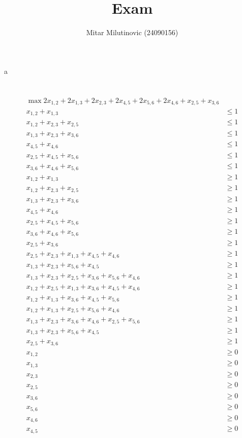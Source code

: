 \documentclass[a4paper,11pt,oneside,onecolumn]{article}
\title{Exam}
\author{Mitar Milutinovic (24090156)}
\begin{document}
\maketitle

\section{}

a

\section{}

\begin{align*}
\max 2x_{1,2} + 2x_{1,3} + 2x_{2,3} + 2x_{4,5} + 2x_{5,6} + 2x_{4,6} + x_{2,5} + x_{3,6} & \\
x_{1,2} + x_{1,3} & \le 1 \\
x_{1,2} + x_{2,3} + x_{2,5} & \le 1 \\
x_{1,3} + x_{2,3} + x_{3,6} & \le 1 \\
x_{4,5} + x_{4,6} & \le 1 \\
x_{2,5} + x_{4,5} + x_{5,6} & \le 1 \\
x_{3,6} + x_{4,6} + x_{5,6} & \le 1 \\
x_{1,2} + x_{1,3} & \ge 1 \\
x_{1,2} + x_{2,3} + x_{2,5} & \ge 1 \\
x_{1,3} + x_{2,3} + x_{3,6} & \ge 1 \\
x_{4,5} + x_{4,6} & \ge 1 \\
x_{2,5} + x_{4,5} + x_{5,6} & \ge 1 \\
x_{3,6} + x_{4,6} + x_{5,6} & \ge 1 \\
x_{2,5} + x_{3,6} & \ge 1 \\
x_{2,5} + x_{2,3} + x_{1,3} + x_{4,5} + x_{4,6} & \ge 1 \\
x_{1,3} + x_{2,3} + x_{5,6} + x_{4,5} & \ge 1 \\
x_{1,3} + x_{2,3} + x_{2,5} + x_{3,6} + x_{5,6} + x_{4,6} & \ge 1 \\
x_{1,2} + x_{2,5} + x_{1,3} + x_{3,6} + x_{4,5} + x_{4,6} & \ge 1 \\
x_{1,2} + x_{1,3} + x_{3,6} + x_{4,5} + x_{5,6} & \ge 1 \\
x_{1,2} + x_{1,3} + x_{2,5} + x_{5,6} + x_{4,6} & \ge 1 \\
x_{1,3} + x_{2,3} + x_{3,6} + x_{4,6} + x_{2,5} + x_{5,6} & \ge 1 \\
x_{1,3} + x_{2,3} + x_{5,6} + x_{4,5} & \ge 1 \\
x_{2,5} + x_{3,6} & \ge 1 \\
x_{1,2} & \ge 0 \\
x_{1,3} & \ge 0 \\
x_{2,3} & \ge 0 \\
x_{2,5} & \ge 0 \\
x_{3,6} & \ge 0 \\
x_{5,6} & \ge 0 \\
x_{4,6} & \ge 0 \\
x_{4,5} & \ge 0 \\
\end{align*}
\end{document}
